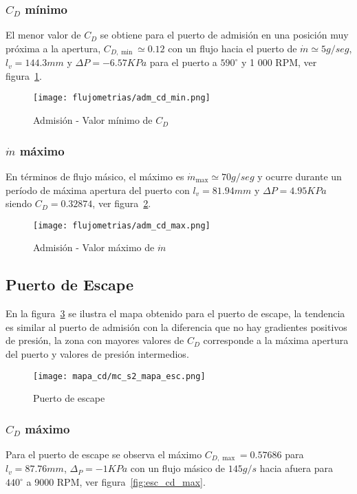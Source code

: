 \subsubsection{$C_{D}$ mínimo}
%
El menor valor de $C_{D}$ se obtiene para el puerto de admisión en una
posición muy próxima a la apertura, $C_{D,\min}\simeq 0.12$ con un flujo hacia
el puerto de $\dot{m}\simeq 5 g/seg$, $l_{v}=144.3 mm$ y $\Delta P=-6.57 KPa$ para
el puerto a $590^{\circ}$ y 1 000 RPM, ver figura~\ref{fig:adm_cd_min}.

\begin{figure}[ht!]
    \centering
    \texttt{[image: flujometrias/adm\_cd\_min.png]}
    \caption{Admisión - Valor mínimo de $C_{D}$}\label{fig:adm_cd_min}
\end{figure}

\subsubsection{$\dot{m}$ máximo}
%
En términos de flujo másico, el máximo es $\dot{m}_{\max}\simeq 70 g/seg$ y ocurre
durante un período de máxima apertura del puerto con $l_{v}=81.94 mm$ y
$\Delta P=4.95 KPa$ siendo $C_{D}=0.32874$, ver figura~\ref{fig:adm_m_max}.

\begin{figure}[ht!]
    \centering
    \texttt{[image: flujometrias/adm\_cd\_max.png]}
    \caption{Admisión - Valor máximo de $\dot{m}$}\label{fig:adm_m_max}
\end{figure}

\subsection{Puerto de Escape}
%
En la figura~\ref{fig:mapa_cd_escape} se ilustra el mapa obtenido para el puerto
de escape, la tendencia es similar al puerto de admisión con la diferencia que
no hay gradientes positivos de presión, la zona con mayores valores de $C_{D}$
corresponde a la máxima apertura del puerto y valores de presión intermedios.
%

\begin{figure}[ht!]
    \centering
    \texttt{[image: mapa\_cd/mc\_s2\_mapa\_esc.png]}
    \caption{Puerto de escape}\label{fig:mapa_cd_escape}
\end{figure}

\subsubsection{$C_{D}$ máximo}
%
Para el puerto de escape se observa el máximo $C_{D,\max}=0.57686$ para
$l_{v}=87.76 mm$, $\Delta_{P}=-1 KPa$ con un flujo másico de $145 g/s$ hacia
afuera para $440^{\circ}$ a 9000 RPM, ver figura~\ref{fig:esc_cd_max}.

